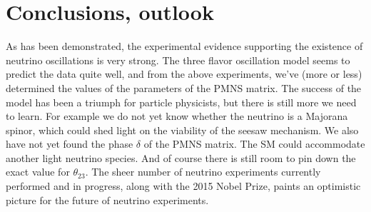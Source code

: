 \section{Conclusions, outlook}
As has been demonstrated, the experimental evidence supporting the existence of
neutrino oscillations is very strong. The three flavor oscillation model seems
to predict the data quite well, and from the above experiments, we've (more or
less) determined the values of the parameters of the PMNS matrix.
The success of the model has been a triumph for particle
physicists, but there is still more we need to learn. For example we do not yet
know whether the neutrino is a Majorana spinor, which could shed light on the
viability of the seesaw mechanism. We also have not yet found the
phase $\delta$ of the PMNS matrix. The SM could accommodate another light
neutrino species. And of course there is still room to pin down the exact
value for $\theta_{23}$. The sheer number of neutrino experiments currently
performed and in progress, along with the 2015 Nobel Prize, paints an
optimistic picture for the future of neutrino experiments.



